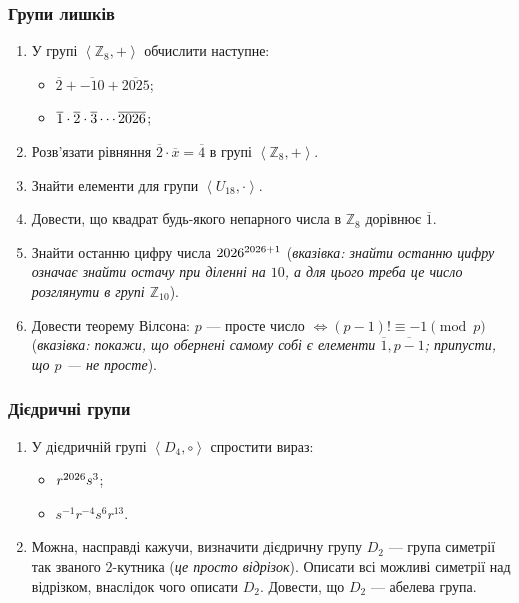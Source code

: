 \documentclass{math_library}
\begin{document}
\subsubsection{Групи лишків}
\begin{enumerate}[wide=0pt,label=\thesubsection.\arabic*]
\item У групі $\left<\mathbb{Z}_8,+\right>$ обчислити наступне:
 \begin{itemize}[nosep,wide=0pt]
\item $\overline{2} + \overline{-10} + \overline{2025}$;
\item $\overline{1} \cdot \overline{2} \cdot \overline{3} \cdots \overline{\the\year}$;
\end{itemize}

\item Розв'язати рівняння $\overline{2} \cdot \overline{x} = \overline{4}$ в групі $\left<\mathbb{Z}_8,+\right>$.

\item Знайти елементи для групи $\left< U_{18}, \cdot \right>$.

\item Довести, що квадрат будь-якого непарного числа в $\mathbb{Z}_8$ дорівнює $\overline{1}$.

\item Знайти останню цифру числа $\the\year^{{\the\year+1}}$ (\textit{вказівка: знайти останню цифру означає знайти остачу при діленні на $10$, а для цього треба це число розглянути в групі $\mathbb{Z}_{10}$}).

\item Довести теорему Вілсона: $p$ --- просте число $\iff (p-1)! \equiv -1 \pmod p$ (\textit{вказівка: \rightproof покажи, що обернені самому собі є елементи $\overline{1},\overline{p-1}$; \leftproof припусти, що $p$ --- не просте}).
\end{enumerate}

\subsubsection{Дієдричні групи}
\begin{enumerate}[wide=0pt,label=\thesubsection.\arabic*, start=6]
\item У дієдричній групі $\left< D_4, \circ\right>$ спростити вираз:
\begin{itemize}[nosep,wide=0pt]
\item $r^{\the\year} s^3$;
\item $s^{-1} r^{-4} s^6 r^{13}$.
\end{itemize}

\item Можна, насправді кажучи, визначити дієдричну групу $D_2$ --- група симетрії так званого $2$-кутника (\textit{це просто відрізок}). Описати всі можливі симетрії над відрізком, внаслідок чого описати $D_2$. Довести, що $D_2$ --- абелева група.
\end{enumerate}
\end{document}
